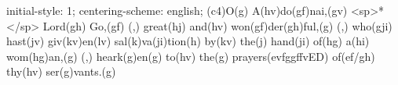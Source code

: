 initial-style: 1;
centering-scheme: english;
(c4)O(g) A(hv)do(gf)nai,(gv) <sp>*</sp> Lord(gh) Go,(gf) (,) great(hj) and(hv) won(gf)der(gh)ful,(g) (,) who(gji) hast(jv) giv(kv)en(lv) sal(k)va(ji)tion(h) by(kv) the(j) hand(ji) of(hg) a(hi) wom(hg)an,(g) (,) heark(g)en(g) to(hv) the(g) prayers(evfggffvED) of(ef/gh) thy(hv) ser(g)vants.(g)
